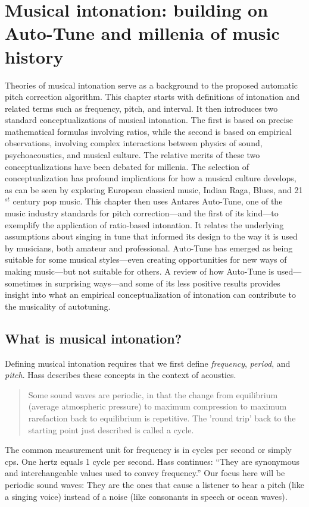 \chapter{Musical intonation: building on Auto-Tune and millenia of music history}
\label{chap:intonation}
Theories of musical intonation serve as a background to the proposed automatic pitch correction algorithm. This chapter starts with definitions of intonation and related terms such as frequency, pitch, and interval. It then introduces two standard conceptualizations of musical intonation. The first is based on precise mathematical formulas involving ratios, while the second is based on empirical observations, involving complex interactions between physics of sound, psychoacoustics, and musical culture. The relative merits of these two conceptualizations have been debated for millenia. The selection of conceptualization has profound implications for how a musical culture develops, as can be seen by exploring European classical music, Indian Raga, Blues, and 21$^{st}$ century pop music. This chapter then uses Antares Auto-Tune, one of the music industry standards for pitch correction---and the first of its kind---to exemplify the application of ratio-based intonation. It relates the underlying assumptions about singing in tune that informed its design to the way it is used by musicians, both amateur and professional. Auto-Tune has emerged as being suitable for some musical styles---even creating opportunities for new ways of making music---but not suitable for others. A review of how Auto-Tune is used---sometimes in surprising ways---and some of its less positive results provides insight into what an empirical conceptualization of intonation can contribute to the musicality of autotuning.

\section{What is musical intonation?} 
Defining musical intonation requires that we first define \textit{frequency}, \textit{period}, and \textit{pitch}. Hass describes these concepts in the context of acoustics. \begin{quotation}Some sound waves are periodic, in that the change from equilibrium (average atmospheric pressure) to maximum compression to maximum rarefaction back to equilibrium is repetitive. The 'round trip' back to the starting point just described is called a cycle.\end{quotation} The common measurement unit for frequency is in cycles per second or simply cps. One hertz equals 1 cycle per second. Hass continues: ``They are synonymous and interchangeable values used to convey frequency.'' \cite[][Ch.~1, Sec.~4--5]{hass2019introduction} Our focus here will be periodic sound waves: They are the ones that cause a listener to hear a pitch (like a singing voice) instead of a noise (like consonants in speech or ocean waves). %

